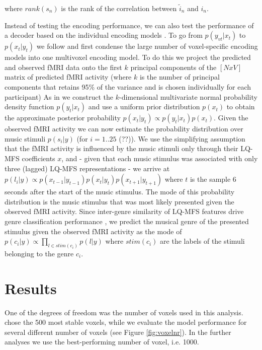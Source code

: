 where $rank(s_{n})$ is the rank of the correlation between $\widetilde{i}_{n}$
and $i_{n}$.

Instead of testing the encoding performance, we can also test the performance of
a decoder based on the individual encoding models \citet{NG11}. To go from
$p(y_{vt}|x_{t})$ to $p(x_{t}|y_{t})$ we follow \citet{NG09} and first condense
the large number of voxel-specific encoding models into one multivoxel encoding model.
To do this we project the predicted and observed f{MRI} data onto the first $k$ principal components of the $[N x V]$ matrix of predicted f{MRI} activity  (where $k$ is the number of principal components that retains 95\% of the variance and is chosen individually for each participant) 
As in \citet{NG09} we construct the $k$-dimensional multivariate normal
probability density function $p(y_{t}|x_{t})$ and use a uniform prior
distribution $p(x_{t})$ to obtain the approximate posterior probability
$p(x_{t}|y_{t}) \propto p(y_{t}|x_{t})p(x_{t})$. Given the observed f{MRI}
activity we can now estimate the probability distribution over music stimuli
$p(s_{i}|y)$ (for $i=1..25$ (??)). We use the simplifying assumption that the
f{MRI} activity is influenced by the music stimuli only through their LQ-MFS
coefficients $x$, and - given that each music stimulus was associated with only
three (lagged) LQ-MFS representations - we arrive at $p(l_{i}|y) \propto
p(x_{t-1}|y_{t-1})p(x_{t}|y_{t})p(x_{t+1}|y_{t+1})$ where $t$ is the sample 6
seconds after the start of the music stimulus. The mode of this probability
distribution is the music stimulus that was most likely presented given the
observed f{MRI} activity. Since inter-genre similarity of LQ-MFS features drive
genre classification performance \citep{CTK+2012}, we predict the musical genre
of the presented stimulus given the observed f{MRI} activity as the mode of $p(c_{i}|y)
\propto \prod\nolimits_{l \in stim(c_{i})} p(l|y)$ where $stim(c_{i})$ are
the labels of the stimuli belonging to the genre $c_{i}$. 

\section*{Results}
%
 One of the degrees
of freedom was the number of voxels used in this analysis. \citet{ML08} chose
the 500 most stable voxels, while we evaluate the model performance for several
different number of voxels (see Figure \ref{fig:voxelnr}). In the further
analyses we use the best-performing number of voxel, i.e. 1000.

